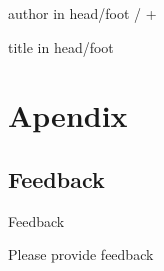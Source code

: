 \documentclass[english,aspectratio=169,handout]{beamer}
\begin{document}
\appendix
{%
\begin{beamercolorbox}[wd=0.5\textwidth,ht=3ex,dp=1.5ex,leftskip=.5em,rightskip=.5em]{author in head/foot}%
%
\insertframenumber{} / \insertmainframenumber{} + \insertappendixframenumber{}\hfill\insertshortauthor%
\end{beamercolorbox}%
\vspace*{-4.5ex}\hspace*{0.5\textwidth}%
\begin{beamercolorbox}[wd=0.5\textwidth,ht=3ex,dp=1.5ex,left,leftskip=.5em]{title in head/foot}%
%
\insertshorttitle%
\end{beamercolorbox}%
}
\beamerdefaultoverlayspecification{}

\section*{Apendix}

\subsection*{Feedback}
\begin{frame}{Feedback}
\begin{center}
{  Please provide feedback}
\end{center}
\end{frame}
\end{document}
